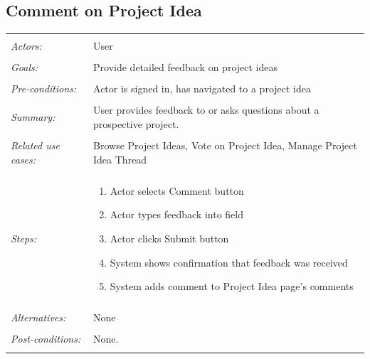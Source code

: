 \documentclass[11pt]{report}
\begin{document}
\subsection{Comment on Project Idea}
\begin{tabular}{ p{2cm} p{12cm} }
 \hline
 \\
 \textit{Actors:} & User \\ 
 \\
 \textit{Goals:} & Provide detailed feedback on project ideas  \\
 \\
 \textit{Pre-conditions:} & Actor is signed in, has navigated to a project idea  \\
 \\
 \textit{Summary:} &  User provides feedback to or asks questions about a prospective project. \\ 
 \\
 \textit{Related use cases:} & Browse Project Ideas, Vote on Project Idea, Manage Project Idea Thread \\ 
 \\
 \textit{Steps:} & \begin{enumerate}
  \item Actor selects Comment button
  \item Actor types feedback into field 
  \item Actor clicks Submit button
  \item System shows confirmation that feedback was received 
  \item System adds comment to Project Idea page's comments
 \end{enumerate} \\
 \\
 \textit{Alternatives:} & None \\
 \\
 \textit{Post-conditions:} & None. \\
 \\
\hline 
\end{tabular}
\end{document}

